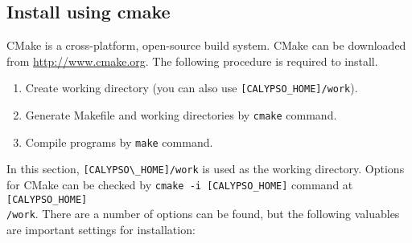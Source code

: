 \subsection{Install using cmake}
CMake is a cross-platform, open-source build system. CMake can be downloaded from \url{http://www.cmake.org}. The following procedure is required to install.
%
\begin{enumerate}
\item Create working directory (you can also use \verb|[CALYPSO_HOME]/work|).
\item Generate Makefile and working directories by {\tt cmake} command.
\item Compile programs by {\tt make} command.
\end{enumerate}
%
In this section, \verb|[CALYPSO\_HOME]/work| is used as the working directory.
Options for CMake can be checked by \verb|cmake -i [CALYPSO_HOME]| command at \verb|[CALYPSO_HOME]| \\
\verb|/work|. There are a number of options can be found, but the following valuables are important settings for installation:
%
